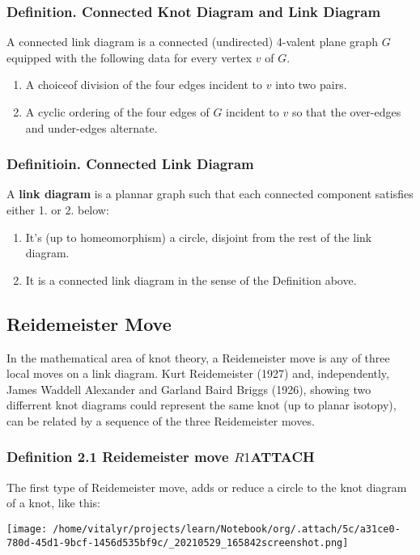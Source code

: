 \documentclass[lang=cn]{elegantpaper}
\begin{document}
\subsubsection{Definition. Connected Knot Diagram and Link Diagram}
\label{sec:orged23359}
A connected link diagram is a connected (undirected) 4-valent plane graph \(G\) equipped with the following data for every vertex \(v\) of \(G\).
\begin{enumerate}
\item A choiceof division of the four edges incident to \(v\) into two pairs.
\item A cyclic ordering of the four edges of \(G\) incident to \(v\) so that the over-edges and under-edges alternate.
\end{enumerate}

\subsubsection{Definitioin. Connected Link Diagram}
\label{sec:orgdb7a822}
A \textbf{link diagram} is a plannar graph such that each connected component satisfies either 1. or 2. below:
\begin{enumerate}
\item It's (up to homeomorphism) a circle, disjoint from the rest of the link diagram.
\item It is a connected link diagram in the sense of the Definition above.
\end{enumerate}
\subsection{Reidemeister Move}
\label{sec:org383bccb}
In the mathematical area of knot theory, a Reidemeister move is any of three local moves on a link diagram. Kurt Reidemeister (1927) and, independently, James Waddell Alexander and Garland Baird Briggs (1926), showing two differrent  knot diagrams could represent the same knot (up to planar isotopy), can be related by a sequence of the three Reidemeister moves.
\subsubsection{Definition 2.1 Reidemeister move \(R1\)\hfill{}\textsc{ATTACH}}
\label{sec:org5f8c131}
The first type of Reidemeister move, adds or reduce a circle to the knot diagram of a knot, like this:
\begin{center}
\texttt{[image: /home/vitalyr/projects/learn/Notebook/org/.attach/5c/a31ce0-780d-45d1-9bcf-1456d535bf9c/\_20210529\_165842screenshot.png]}
\end{center}
\end{document}
